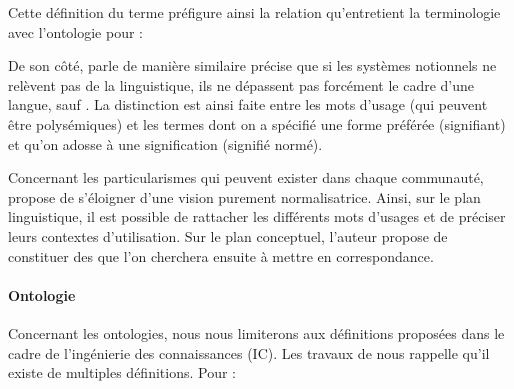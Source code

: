 Cette définition du terme préfigure ainsi la relation qu'entretient la terminologie avec l'ontologie pour \cite{bachimont:icc} : 


De son côté, \cite[\S 2.4]{Roche2005} parle de manière similaire 
\citeauthor{Roche2005} précise que si les systèmes notionnels ne relèvent pas de la linguistique, ils ne dépassent pas forcément le cadre d'une langue, sauf .
La distinction est ainsi faite entre les mots d'usage (qui peuvent être polysémiques) et les termes dont on a spécifié une forme préférée (signifiant) et qu'on adosse à une signification (signifié normé).  

Concernant les particularismes qui peuvent exister dans chaque communauté, \citeauthor{Roche2005} propose de s'éloigner d'une vision purement normalisatrice. 
Ainsi, sur le plan linguistique, il est possible de rattacher les différents mots d'usages et de préciser leurs contextes d'utilisation.
Sur le plan conceptuel, l'auteur propose de constituer des  que l'on cherchera ensuite à mettre en correspondance. 




\paragraph{Ontologie}
Concernant les ontologies, nous nous limiterons aux définitions proposées dans le cadre de l'ingénierie des connaissances (IC). Les travaux de \cite{Charlet2002} nous rappelle qu'il existe de multiples définitions. Pour \cite{Gruber1993} : 


